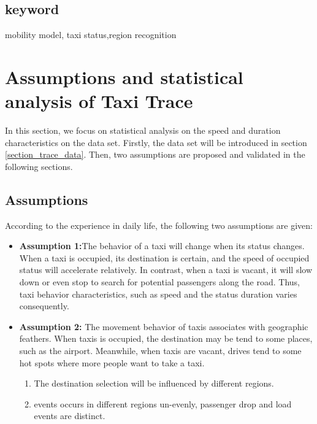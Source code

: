 \documentclass[camera-ready,twocolumn,10pt]{IEEEtran}
\begin{document}
\subsection*{keyword}
mobility model, taxi status,region recognition




\section{Assumptions and statistical analysis of Taxi Trace}
\label{section_assumptions_anlysis}

In this section, we focus on statistical analysis on the speed and duration characteristics on the data set.
Firstly, the data set will be introduced in section \ref{section_trace_data}. Then, two assumptions are proposed and validated in the following sections.



\subsection{Assumptions}
\label{section_statistic_analysis}
According to the experience in daily life, the following two assumptions are given:

\begin{itemize}
  \item \textbf{Assumption 1:}The behavior of a taxi will change when its status changes. When a taxi is occupied, its destination is certain, and the speed of occupied status will accelerate relatively. In contrast, when a taxi is vacant, it will slow down or even stop to search for potential passengers along the road. Thus, taxi behavior characteristics, such as speed and the status duration varies consequently.

  \item \textbf{Assumption 2:} The movement behavior of taxis associates with geographic feathers. When taxis is occupied, the destination may be tend to some places, such as the airport. Meanwhile, when taxis are vacant, drives tend to some hot spots where more people want to take a taxi.
      \begin{enumerate}
        \item The destination selection will be influenced by different regions.
        \item events occurs in different regions un-evenly, passenger drop and load events are distinct.
      \end{enumerate}
\end{itemize}
\end{document}
